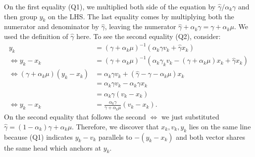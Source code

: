 \documentclass[12pt]{article}
\begin{document}
        On the first equality (Q1), we multiplied both side of the equation by $\hat\gamma/\alpha_k \gamma$ and then group $y_k$ on the LHS. 
        The last equality comes by multiplying both the numerator and denominator by $\hat \gamma$, leaving the numerator $\hat \gamma + \alpha_k \gamma = \gamma + \alpha_k \mu$. 
        We used the definition of $\hat \gamma$ here. 
        To see the second equality (Q2), consider: 
        \begin{align*}
            y_k &= (\gamma + \alpha_k \mu)^{-1}(\alpha_k \gamma v_k + \hat\gamma x_k)
            \\
            \iff
            y_k - x_k &= 
            (\gamma + \alpha_k \mu)^{-1}
            (\alpha_k \gamma_k v_k - (\gamma + \alpha_k \mu)x_k + \hat \gamma x_k)
            \\
            \iff 
            (\gamma + \alpha_k \mu)(y_k - x_k)
            &= 
            \alpha_k\gamma v_k + 
            (\hat \gamma - \gamma - \alpha_k \mu) x_k
            \\
            &= \alpha_k \gamma v_k - \alpha_k \gamma x_k 
            \\
            &= \alpha_k \gamma(v_k - x_k)
            \\
            \iff 
            y_k - x_k &= 
            \frac{\alpha_k \gamma}{\gamma + \alpha_k \mu}(v_k - x_k). 
        \end{align*}
        On the second equality that follows the second $\iff$ we just substituted $\hat\gamma = (1 - \alpha_k)\gamma + \alpha_k \mu$. 
        Therefore, we discover that $x_k, v_k, y_k$ lies on the same line because (Q1) indicates $y_k - v_k$ parallels to $-(y_k - x_k)$ and both vector shares the same head which anchors at $y_k$. 
    
\end{document}
